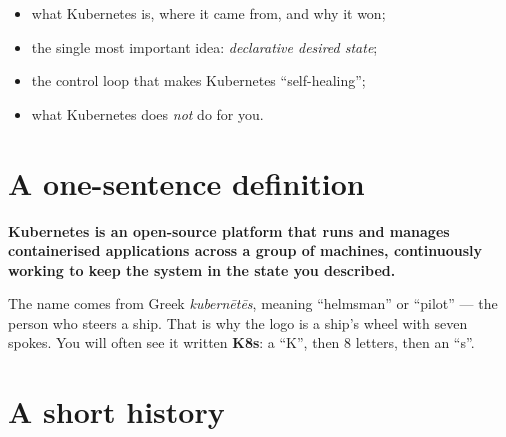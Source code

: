 
\begin{objectives}
\begin{itemize}
  \item what Kubernetes is, where it came from, and why it won;
  \item the single most important idea: \emph{declarative desired state};
  \item the control loop that makes Kubernetes ``self-healing'';
  \item what Kubernetes does \emph{not} do for you.
\end{itemize}
\end{objectives}

\section{A one-sentence definition}

\begin{keyidea}
\textbf{Kubernetes is an open-source platform that runs and manages
containerised applications across a group of machines, continuously working to
keep the system in the state you described.}
\end{keyidea}

The name comes from Greek \textit{kubern\=et\=es}, meaning ``helmsman'' or
``pilot'' --- the person who steers a ship. That is why the logo is a ship's
wheel with seven spokes. You will often see it written \textbf{K8s}: a ``K'',
then 8 letters, then an ``s''.

\section{A short history}

\begin{center}
\end{center}

